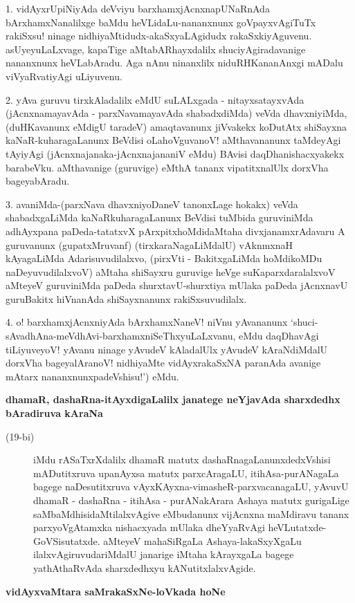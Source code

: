 \begin{artha}
1. vidAyxrUpiNiyAda deVviyu barxhamxjAcnxnapUNaRnAda bArxhamxNanalilxge baMdu heVLidaLu-\-nananxnunx goVpayxvAgiTuTx rakiSxsu! ninage nidhiyaMtidudx-akaSxya\-LAgidudx rakaSxkiyAguvenu. asUyeyuLaLxvage, kapaTige aMtabARhayxdalilx shuciyAgiradavanige nananxnunx heVLabAradu. Aga nAnu ninanxlilx niduRHKa\-nanAnxgi mADalu viVyaRvatiyAgi uLiyuvenu.
\end{artha}

\begin{artha}
2. yAva guruvu tirxkAladalilx eMdU suLALxgada - nitayxsatayxvAda (jAcnxnamayavAda - parxNava\-maya\-vAda shabadxdiMda) veVda dhavxniyiMda, (duHKavanunx eMdigU taradeV) amaqtavanunx jiVvakekx koDu\-tAtx shiSayxna kaNaR-kuharagaLanunx BeVdisi oLahoVguvanoV! aMthavananunx taMdeyAgi tAyi\-yAgi (jAcnxnajanaka-jAcnxnajananiV eMdu) BAvisi daqDhanishacxyakekx barabeVku. aMthavanige (guru\-vige) eMthA tananx vipatitxnalUlx dorxVha bageyabAradu.
\end{artha}

\begin{artha}
3. avaniMda-(parxNava dhavxniyoDaneV tanonxLage hokakx) veVda shabadxgaLiMda kaNaR\-kuharagaLanunx BeVdisi tuMbida guruviniMda adhAyxpana paDeda-tatatxvX pArxpitxhoMdidaMtaha divxjanamxrAdavaru A guruvanunx (gupatxM\-ruvanf) (tirxkaraNagaLiMdalU) vAknmxnaH kAyagaLiMda Adarisuvudilalxvo, (pirxVti - Bakitx\-gaLiMda hoMdi\-koMDu naDeyuvudilalxvoV) aMtaha shiSayxru guruvige heVge suKaparxda\-ralalxvoV aMteyeV guruviniMda paDeda shurxtavU-shurxtiya mUlaka paDeda jAcnxnavU guru\-Bakitx hiVnanAda shiSayxnanunx rakiSx\-suvudilalx.
\end{artha}

\begin{artha}
4. o! barxhamxjAcnxniyAda bArxhamxNaneV! niVnu yAvananunx `shuci-sAvadhAna-\-meVdhAvi-barxhamxniSeThx\-yuLaLx\-vanu, eMdu daqDhavAgi tiLiyuveyoV! yAvanu ninage yAvudeV kAladalUlx yAvudeV kAraNdiMdalU dorxVha bageyalAranoV! nidhiyaMte vidAyxrakaSxNA paranAda avanige mAtarx nananxnunxpadeVshisu!') eMdu.
\end{artha}

\newpage

{\bigskip
\noindent
{\large\bf dhamaR, dashaRna-itAyxdigaLalilx janatege neYjavAda sharxdedhx bAradiruva kAraNa}}\label{page50}
\begin{description}
\item[(19-bi)] iMdu rASaTxrXdalilx dhamaR matutx dashaRnagaLanunxdedxVshisi mADutitxruva upanAyxsa matutx parxcAra\-gaLU, itihAsa-purANagaLa bagege naDesutitxruva vAyxKAyxna-vimasheR-parxvacanagaLU, yAvuvU dhamaR - dashaRna - itihAsa - purANakArara Ashaya matutx gurigaLige saMbaMdhisidaMtilalx\-vAgive \-eMbudanunx vijAcnxna maMdiravu tananx parxyoVgAtamxka nishacxyada mUlaka dheYyaRvAgi heVLu\-tatxde-GoVSisutatxde. aMteyeV mahaSiRgaLa Ashaya-lakaSxyXgaLu ilalxvAgiruvudariMdalU jana\-rige iMtaha kArayxgaLa bagege yathAthaRvAda sharxdedhxyu kANutitxlalxvAgide.
\end{description}
{\medskip
\noindent
{\large\bf vidAyxvaMtara saMrakaSxNe-loVkada hoNe}}
\medskip

